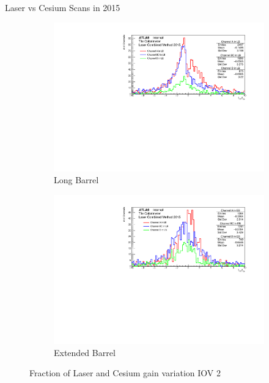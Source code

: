 \documentclass{beamer}
\begin{document}
\begin{frame}{Laser vs Cesium Scans in 2015}
\begin{figure}[H]
\centering
\begin{subfigure} [t] {0.49\textwidth}
\includegraphics[width=\textwidth]{ratio_lb_iov2.pdf}
\caption{Long Barrel}
\end{subfigure}
\begin{subfigure} [t] {0.49\textwidth}
\includegraphics[width=\textwidth]{ratio_eb_iov2.pdf}
\caption{Extended Barrel}
\end{subfigure}
\caption{Fraction of Laser and Cesium gain variation IOV 2}
\end{figure}
\end{frame}
\end{document}
